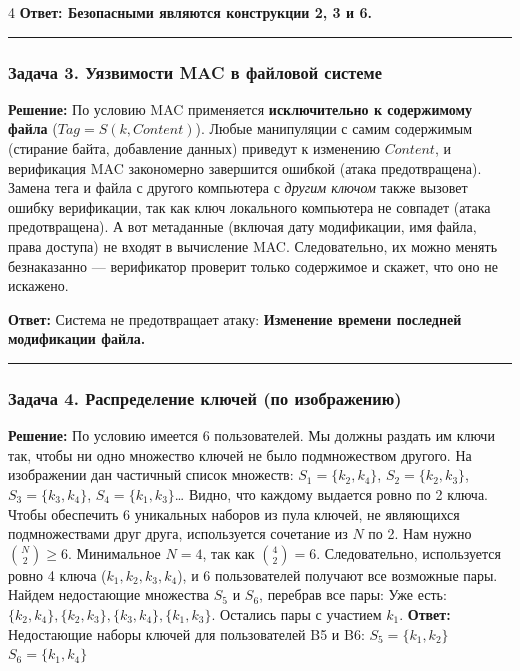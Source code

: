﻿\documentclass[8pt,a4paper,landscape]{extarticle}
\begin{document}
\begin{multicols*}{4}
\textbf{Ответ: Безопасными являются конструкции 2, 3 и 6.}

\begin{center}\rule{0.5\linewidth}{0.5pt}\end{center}

\subsubsection{Задача 3. Уязвимости MAC в файловой системе}\label{ux437ux430ux434ux430ux447ux430-3.-ux443ux44fux437ux432ux438ux43cux43eux441ux442ux438-mac-ux432-ux444ux430ux439ux43bux43eux432ux43eux439-ux441ux438ux441ux442ux435ux43cux435}

\textbf{Решение:} По условию MAC применяется \textbf{исключительно к содержимому файла} (\(Tag = S(k, Content)\)). Любые манипуляции с самим содержимым (стирание байта, добавление данных) приведут к изменению \(Content\), и верификация MAC закономерно завершится ошибкой (атака предотвращена). Замена тега и файла с другого компьютера с \emph{другим ключом} также вызовет ошибку верификации, так как ключ локального компьютера не совпадет (атака предотвращена). А вот метаданные (включая дату модификации, имя файла, права доступа) не входят в вычисление MAC. Следовательно, их можно менять безнаказанно --- верификатор проверит только содержимое и скажет, что оно не искажено.

\textbf{Ответ:} Система не предотвращает атаку: \textbf{Изменение времени последней модификации файла.}

\begin{center}\rule{0.5\linewidth}{0.5pt}\end{center}

\subsubsection{Задача 4. Распределение ключей (по изображению)}\label{ux437ux430ux434ux430ux447ux430-4.-ux440ux430ux441ux43fux440ux435ux434ux435ux43bux435ux43dux438ux435-ux43aux43bux44eux447ux435ux439-ux43fux43e-ux438ux437ux43eux431ux440ux430ux436ux435ux43dux438ux44e}

\textbf{Решение:} По условию имеется 6 пользователей. Мы должны раздать им ключи так, чтобы ни одно множество ключей не было подмножеством другого. На изображении дан частичный список множеств: \(S_1 = \{k_2, k_4\}\), \(S_2 = \{k_2, k_3\}\), \(S_3 = \{k_3, k_4\}\), \(S_4 = \{k_1, k_3\}\)\ldots{} Видно, что каждому выдается ровно по 2 ключа. Чтобы обеспечить 6 уникальных наборов из пула ключей, не являющихся подмножествами друг друга, используется сочетание из \(N\) по 2. Нам нужно \(\binom{N}{2} \ge 6\). Минимальное \(N=4\), так как \(\binom{4}{2} = 6\). Следовательно, используется ровно 4 ключа (\(k_1, k_2, k_3, k_4\)), и 6 пользователей получают все возможные пары. Найдем недостающие множества \(S_5\) и \(S_6\), перебрав все пары: Уже есть: \(\{k_2, k_4\}, \{k_2, k_3\}, \{k_3, k_4\}, \{k_1, k_3\}\). Остались пары с участием \(k_1\). \textbf{Ответ:} Недостающие наборы ключей для пользователей B5 и B6: \textbf{\(S_5 = \{k_1, k_2\}\)} \textbf{\(S_6 = \{k_1, k_4\}\)}


\end{multicols*}
\end{document}
